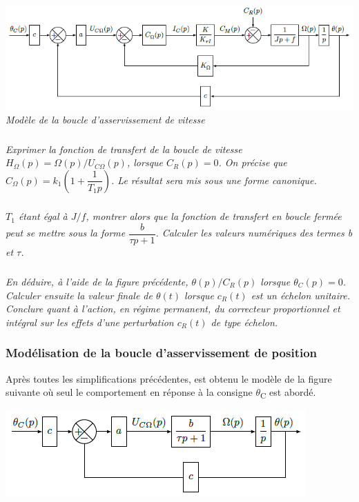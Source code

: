 \documentclass[10pt,fleqn]{article} %
\begin{document}
\begin{multicols}{2}
\begin{center}
\includegraphics[width=1.0\linewidth]{images/image14.png}
\textit{Modèle de la boucle d'asservissement de vitesse \label{fig13}}
\end{center}


\subparagraph{}\textit{Exprimer la fonction de transfert de la boucle de vitesse
  \(H_{\Omega}\left( p \right) = \Omega(p)/U_{C\Omega}(p)\), lorsque
  \(C_{R}\left( p \right) = 0\). On précise que  \(C_{\Omega}\left( p \right) = k_{1}\left( 1 + \dfrac{1}{T_{1}p} \right)\). Le résultat sera mis sous une forme canonique.}
  

\subparagraph{}\textit{$T_1$ étant égal à $J/f$, montrer alors que
  la fonction de transfert en boucle fermée peut se mettre sous la forme
  \(\dfrac{b}{\tau p + 1}\). Calculer les valeurs numériques des termes
  \emph{b} et \emph{$\tau$}.}

\subparagraph{}\textit{En déduire, à l'aide de la figure précédente, $\theta(p)/C_R(p)$
  lorsque $\theta_C(p)=0$. Calculer ensuite la valeur finale
  de $\theta(t)$ lorsque $c_R(t)$ est un échelon unitaire. %
  Conclure quant à l'action, en régime permanent, du correcteur
  proportionnel et intégral sur les effets d'une perturbation
  $c_R(t)$ de type échelon.}


\subsubsection*{Modélisation de la boucle d'asservissement de position}

Après toutes les simplifications précédentes, est obtenu le modèle de la
figure suivante où seul le comportement en réponse à la consigne
$\theta$\textsubscript{C} est abordé.


\begin{center}
\includegraphics[width=\linewidth]{images/image15.png}


\end{center}
\end{multicols}
\end{document}
